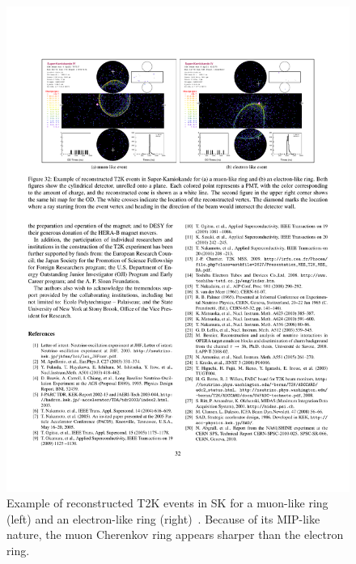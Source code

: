 \begin{figure}[t!]
  \centering
  \includegraphics[width=14cm]{images/t2k/SK_PID.pdf}
  \caption{Example of reconstructed T2K events in SK for a muon-like ring (left) and an electron-like ring (right)~\cite{Abe2011106}.  Because of its MIP-like nature, the muon Cherenkov ring appears sharper than the electron ring.}
  \label{fig:SKPID}
\end{figure}
